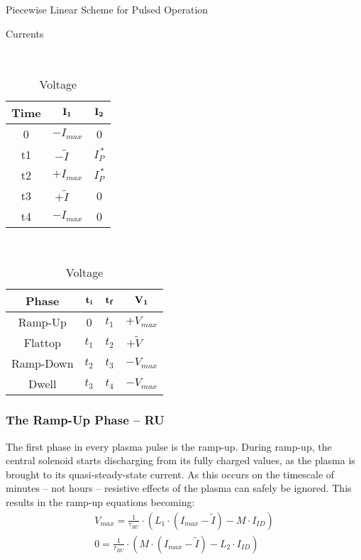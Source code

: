\begin{table}[b!]
\centering
\caption{Piecewise Linear Scheme for Pulsed Operation}
\hfill
\begin{subtable}[t]{0.4\textwidth}
\centering
\caption{Currents} ~\\
\begin{tabular}{ c|c|c }

\textbf{Time} & {$\bold{I_1}$} & {$\bold{I_2}$} \\
\hline
0 & $-I_{max}$ & 0 \\
t1 & $-\tilde I \ \ \ \,\, $ & $I_P^{\,*} $ \\
t2 & $+I_{max}$ & $I_P^{\,*}$ \\
t3 & $+\tilde I \ \ \ \,\, $ & 0 \\
t4 & $-I_{max}$ & 0 \\
\end{tabular}
\end{subtable}
\hfill
\begin{subtable}[t]{0.5\textwidth}
\centering
\caption{Voltage} ~\\
\begin{tabular}{ c|c|c|c }
\textbf{Phase} & $\bold{t_i}$ & $\bold{t_f}$ & $\bold{V_1}$ \\
\hline
Ramp-Up & 0 & $t_1$ & $+V_{max}$ \\
Flattop & $t_1$ & $t_2$ & $+ \tilde V$ \ \,\,\, \\
Ramp-Down & $t_2$ & $t_3$ & ${-V}_{max}$ \\
Dwell & $t_3$ & $t_4$ & ${-V}_{max}$ \\
\end{tabular}
\end{subtable}
\hfill
\hfill
\label{table:piecewise}
\end{table}


\subsubsection{The Ramp-Up Phase -- RU}

The first phase in every plasma pulse is the ramp-up. During ramp-up, the central solenoid starts discharging from its fully charged values, as the plasma is brought to its quasi-steady-state current. As this occurs on the timescale of minutes -- not hours -- resistive effects of the plasma can safely be ignored. This results in the ramp-up equations becoming:
\begin{align}
	V_{max} = \frac{1}{\tau_{RU}} \cdot \left( L_1 \cdot ( I_{max} - \tilde I ) - M \cdot I_{ID} \right) \\
	0 = \frac{1}{\tau_{RU}} \cdot \left( M \cdot ( I_{max} - \tilde I ) - L_2 \cdot I_{ID} \right)
\end{align}


